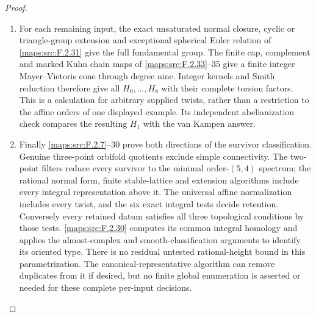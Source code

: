\documentclass[11pt,a4paper]{article}
\theoremstyle{definition}
\begin{document}
\begin{proof}
\begin{enumerate}[label=\arabic*.]
\item For each remaining input, the exact unsaturated normal
closure, cyclic or triangle-group extension and exceptional
spherical Euler relation of \ref{maps:src:F.2.31} give the full fundamental
group.  The finite cap, complement and marked Kuhn chain
maps of \ref{maps:src:F.2.33}--35 give a finite integer Mayer--Vietoris cone
through degree nine.  Integer kernels and Smith reduction
therefore give all $H_0,\ldots,H_8$ with their complete
torsion factors.  This is a calculation for arbitrary
supplied twists, rather than a restriction to the affine
orders of one displayed example.  Its independent
abelianization check compares the resulting $H_1$ with the
van Kampen answer.

\item Finally \ref{maps:src:F.2.7}--30 prove both directions of the survivor
classification.  Genuine three-point orbifold quotients
exclude simple connectivity.  The two-point filters reduce
every survivor to the minimal order-$(5,4)$ spectrum; the
rational normal form, finite stable-lattice and extension
algorithms include every integral representation above it.
The universal affine normalization includes every twist,
and the six exact integral tests decide retention.
Conversely every retained datum satisfies all three
topological conditions by those tests.  \ref{maps:src:F.2.30} computes
its common integral homology and applies the almost-complex
and smooth-classification arguments to identify its oriented
type.  There is no residual untested rational-height bound
in this parametrization.  The canonical-representative
algorithm can remove duplicates from it if desired, but
no finite global enumeration is asserted or needed for
these complete per-input decisions.

\end{enumerate}
\end{proof}
\end{document}
